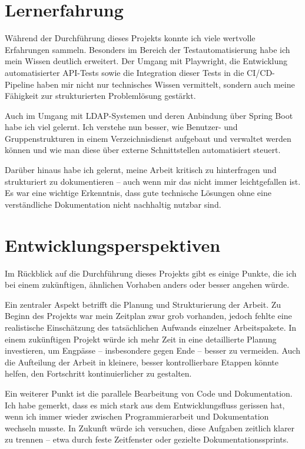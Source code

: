 \section{Lernerfahrung}
Während der Durchführung dieses Projekts konnte ich viele wertvolle Erfahrungen sammeln. Besonders im Bereich der Testautomatisierung habe ich mein Wissen deutlich erweitert. Der Umgang mit Playwright, die Entwicklung automatisierter API-Tests sowie die Integration dieser Tests in die CI/CD-Pipeline haben mir nicht nur technisches Wissen vermittelt, sondern auch meine Fähigkeit zur strukturierten Problemlösung gestärkt.

Auch im Umgang mit LDAP-Systemen und deren Anbindung über Spring Boot habe ich viel gelernt. Ich verstehe nun besser, wie Benutzer- und Gruppenstrukturen in einem Verzeichnisdienst aufgebaut und verwaltet werden können und wie man diese über externe Schnittstellen automatisiert steuert.

Darüber hinaus habe ich gelernt, meine Arbeit kritisch zu hinterfragen und strukturiert zu dokumentieren – auch wenn mir das nicht immer leichtgefallen ist. Es war eine wichtige Erkenntnis, dass gute technische Lösungen ohne eine verständliche Dokumentation nicht nachhaltig nutzbar sind.

\section{Entwicklungsperspektiven}
Im Rückblick auf die Durchführung dieses Projekts gibt es einige Punkte, die ich bei einem zukünftigen, ähnlichen Vorhaben anders oder besser angehen würde.

Ein zentraler Aspekt betrifft die Planung und Strukturierung der Arbeit. Zu Beginn des Projekts war mein Zeitplan zwar grob vorhanden, jedoch fehlte eine realistische Einschätzung des tatsächlichen Aufwands einzelner Arbeitspakete. In einem zukünftigen Projekt würde ich mehr Zeit in eine detaillierte Planung investieren, um Engpässe – insbesondere gegen Ende – besser zu vermeiden. Auch die Aufteilung der Arbeit in kleinere, besser kontrollierbare Etappen könnte helfen, den Fortschritt kontinuierlicher zu gestalten.

Ein weiterer Punkt ist die parallele Bearbeitung von Code und Dokumentation. Ich habe gemerkt, dass es mich stark aus dem Entwicklungsfluss gerissen hat, wenn ich immer wieder zwischen Programmierarbeit und Dokumentation wechseln musste. In Zukunft würde ich versuchen, diese Aufgaben zeitlich klarer zu trennen – etwa durch feste Zeitfenster oder gezielte Dokumentationssprints.

